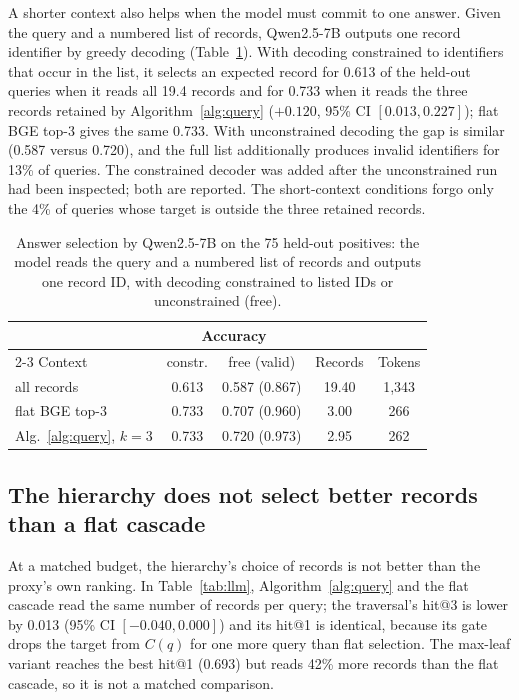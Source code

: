 \documentclass{ieeeaccess}
\begin{document}
A shorter context also helps when the model must commit to one answer. Given the
query and a numbered list of records, Qwen2.5-7B outputs one record identifier by
greedy decoding (Table~\ref{tab:answer}). With decoding constrained to identifiers
that occur in the list, it selects an expected record for 0.613 of the held-out
queries when it reads all 19.4 records and for 0.733 when it reads the three
records retained by Algorithm~\ref{alg:query} ($+0.120$, 95\% CI
$[0.013,0.227]$); flat BGE top-3 gives the same 0.733. With unconstrained
decoding the gap is similar (0.587 versus 0.720), and the full list additionally
produces invalid identifiers for 13\% of queries. The constrained decoder was
added after the unconstrained run had been inspected; both are reported. The
short-context conditions forgo only the 4\% of queries whose target is outside
the three retained records.

\begin{table}[!t]
\centering
\caption{Answer selection by Qwen2.5-7B on the 75 held-out positives: the model
reads the query and a numbered list of records and outputs one record ID, with
decoding constrained to listed IDs or unconstrained (free).}
\label{tab:answer}
\footnotesize
\setlength{\tabcolsep}{3pt}
\begin{tabular}{lcccc}
\toprule
& \multicolumn{2}{c}{Accuracy} & & \\
\cmidrule{2-3}
Context & constr. & free (valid) & Records & Tokens \\
\midrule
all records & 0.613 & 0.587 (0.867) & 19.40 & 1,343 \\
flat BGE top-3 & 0.733 & 0.707 (0.960) & 3.00 & 266 \\
Alg.~\ref{alg:query}, $k=3$ & 0.733 & 0.720 (0.973) & 2.95 & 262 \\
\bottomrule
\end{tabular}
\end{table}

\subsection{The hierarchy does not select better records than a flat cascade}
\label{sec:frontier}
At a matched budget, the hierarchy's choice of records is not better than the
proxy's own ranking. In Table~\ref{tab:llm}, Algorithm~\ref{alg:query} and the flat
cascade read the same number of records per query; the traversal's hit@3 is lower
by 0.013 (95\% CI $[-0.040,0.000]$) and its hit@1 is identical, because its gate
drops the target from $C(q)$ for one more query than flat selection. The max-leaf
variant reaches the best hit@1 (0.693) but reads 42\% more records than the flat
cascade, so it is not a matched comparison.
\end{document}

